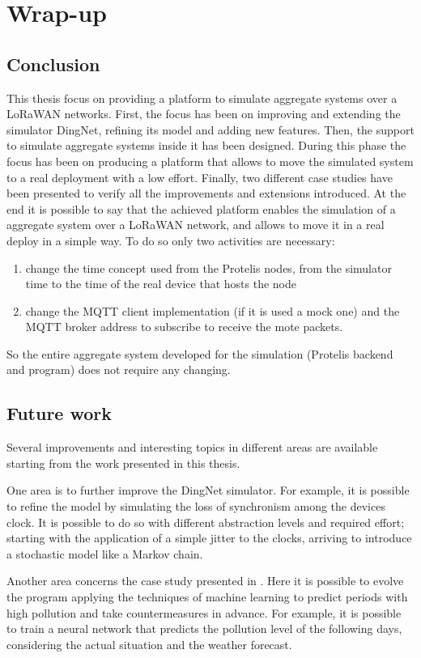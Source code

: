 \chapter{Wrap-up}
\label{chap:conclusions}
\section{Conclusion} 
This thesis focus on providing a platform to simulate aggregate systems over a LoRaWAN networks.
First, the focus has been on improving and extending the simulator DingNet, refining its model and adding new features.
Then, the support to simulate aggregate systems inside it has been designed. 
During this phase the focus has been on producing a platform that allows to move the simulated system to a real deployment with a low effort.
Finally, two different case studies have been presented to verify all the improvements and extensions introduced.
At the end it is possible to say that the achieved platform enables the simulation of a aggregate system over a LoRaWAN network, and allows to move it in a real deploy in a simple way. 
To do so only two activities are necessary:
\begin{enumerate}
    \item change the time concept used from the Protelis nodes, from the simulator time to the time of the real device that hosts the node
    \item change the MQTT client implementation (if it is used a mock one) and the MQTT broker address to subscribe to receive the mote packets.
\end{enumerate}
 So the entire aggregate system developed for the simulation (Protelis backend and program) does not require any changing.

\section{Future work}
Several improvements and interesting topics in different areas are available starting from the work presented in this thesis.

One area is to further improve the DingNet simulator. 
For example, it is possible to refine the model by simulating the loss of synchronism among the devices clock. 
It is possible to do so with different abstraction levels and required effort; starting with the application of a simple jitter to the clocks, arriving to introduce a stochastic model like a Markov chain.

Another area concerns the case study presented in . 
Here it is possible to evolve the program applying the techniques of machine learning to predict periods with high pollution and take countermeasures in advance. 
For example, it is possible to train a neural network that predicts the pollution level of the following days, considering the actual situation and the weather forecast.

